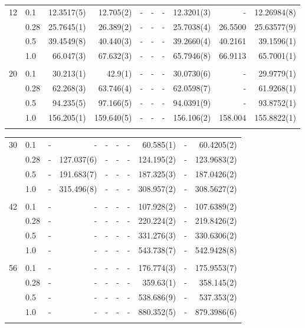 \begin{landscape}
\begin{table} [H]
\begin{tabularx}{\hsize}{l:l|RRRRRRRR}
		12 & 0.1 & 12.3517(5) & 12.705(2) & - & - & - & 12.3201(3) & - & 12.26984(8) \\ 
		& 0.28 & 25.7645(1) & 26.389(2) & - & - & - & 25.7038(4) & 26.5500 & 25.63577(9) \\
		& 0.5 & 39.4549(8) & 40.440(3) & - & - & - & 39.2660(4) & 40.2161 & 39.1596(1) \\
		& 1.0 & 66.047(3) & 67.632(3) & - & - & - & 65.7946(8) & 66.9113 & 65.7001(1) \\ \hdashline \\
		
		20 & 0.1 & 30.213(1) & 42.9(1) & - & - & - & 30.0730(6) & - & 29.9779(1) \\ 
		& 0.28 & 62.268(3) & 63.746(4) & - & - & - & 62.0598(7) & - & 61.9268(1) \\
		& 0.5 & 94.235(5) & 97.166(5) & - & - & - & 94.0391(9) & - & 93.8752(1) \\
		& 1.0 & 156.205(1) & 159.640(5) & - & - & - & 156.106(2) & 158.004 & 155.8822(1) \\ \hdashline
	\end{tabularx}
\end{table}

\begin{table} [H]
	\begin{tabularx}{\hsize}{l:l|RRRRRRRR} \\
		\label{tab:quantumdotswinteraction2D2}
		30 & 0.1 & - & - & - & - & - & 60.585(1) & - & 60.4205(2) \\ 
		& 0.28 & - & 127.037(6) & - & - & - & 124.195(2) & - & 123.9683(2) \\
		& 0.5 & - & 191.683(7) & - & - & - & 187.325(3) & - & 187.0426(2) \\
		& 1.0 & - & 315.496(8) & - & - & - & 308.957(2) & - & 308.5627(2) \\ \hdashline \\
		
		42 & 0.1 & - & - & - & - & - & 107.928(2) & - & 107.6389(2) \\ 
		& 0.28 & - & - & - & - & - & 220.224(2) & - & 219.8426(2) \\
		& 0.5 & - & - & - & - & - & 331.276(3) & - & 330.6306(2) \\
		& 1.0 & - & - & - & - & - & 543.738(7) & - & 542.9428(8) \\ \hdashline \\
		
		56 & 0.1 & - & - & - & - & - & 176.774(3) & - & 175.9553(7) \\ 
		& 0.28 & - & - & - & - & - & 359.63(1) & - & 358.145(2) \\
		& 0.5 & - & - & - & - & - & 538.686(9) & - & 537.353(2) \\
		& 1.0 & - & - & - & - & - & 880.352(5) & - & 879.3986(6) \\ \hdashline \\
		

\end{tabularx}
\end{table}
\end{landscape}
